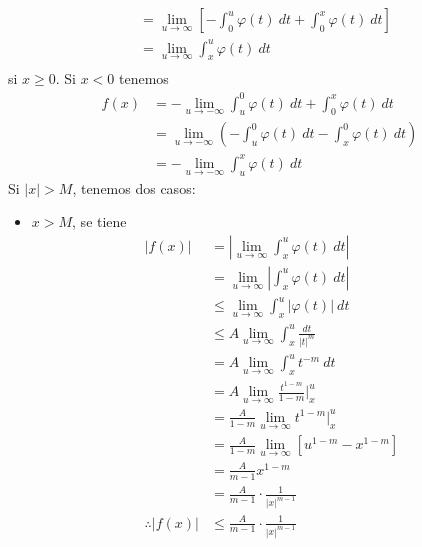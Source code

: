 \documentclass[12pt]{report}
\theoremstyle{largebreak}
\renewcommand{\leq}{\ensuremath{\leqslant}}
\renewcommand{\geq}{\ensuremath{\geqslant}}
\newcommand\abs[1]{\ensuremath{\left|#1\right|}}
\begin{document}
\begin{sol}
\begin{equation*}
\begin{split}
                &=\lim_{u\rightarrow\infty}\left[-\int_0^u\varphi(t)\:dt+\int_0^x\varphi(t)\:dt\right]\\
                &=\lim_{u\rightarrow\infty}\int_x^u\varphi(t)\:dt\\
            \end{split}
        \end{equation*}
        si $x\geq0$. Si $x<0$ tenemos
        \begin{equation*}
            \begin{split}
                f(x)&=-\lim_{u\rightarrow-\infty}\int_u^0\varphi(t)\:dt+\int_0^x\varphi(t)\:dt\\
                &=\lim_{u\rightarrow-\infty}\left(-\int_u^0\varphi(t)\:dt-\int_x^0\varphi(t)\:dt\right)\\
                &=-\lim_{u\rightarrow-\infty}\int_u^x\varphi(t)\:dt
            \end{split}
        \end{equation*}
        Si $\abs{x}>M$, tenemos dos casos:
        \begin{itemize}
            \item $x>M$, se tiene
            \begin{equation*}
                \begin{split}
                    \abs{f(x)}&=\abs{\lim_{u\rightarrow\infty}\int_x^u\varphi(t)\:dt}\\
                    &=\lim_{u\rightarrow\infty}\abs{\int_x^u\varphi(t)\:dt}\\
                    &\leq\lim_{u\rightarrow\infty}\int_x^u\abs{\varphi(t)}\:dt\\
                    &\leq A\lim_{u\rightarrow\infty}\int_x^u\frac{dt}{\abs{t}^m}\\
                    &=A\lim_{u\rightarrow\infty}\int_x^u t^{-m}\:dt \\
                    &=A\lim_{u\rightarrow\infty}\frac{t^{ 1-m}}{1-m}\Big|_x^u\\
                    &=\frac{A}{1-m}\lim_{u\rightarrow\infty}t^{ 1-m}\Big|_x^u\\
                    &=\frac{A}{1-m}\lim_{u\rightarrow\infty}\left[u^{ 1-m}-x^{ 1-m}\right] \\
                    &=\frac{A}{m-1}x^{1-m}\\
                    &=\frac{A}{m-1}\cdot\frac{1}{\abs{x}^{m-1}}\\
                    \therefore \abs{f(x)}&\leq\frac{A}{m-1}\cdot\frac{1}{\abs{x}^{m-1}}\\

\end{split}
\end{equation*}
\end{itemize}
\end{sol}
\end{document}

